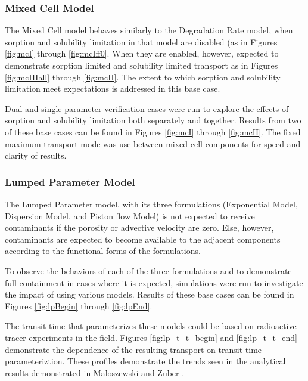\subsubsection{Mixed Cell Model}
The Mixed Cell model behaves similarly to the Degradation Rate model, when 
sorption and solubility limitation in that model are disabled (as in Figures 
\ref{fig:mcI} through \ref{fig:mcIff0}. When they are enabled, however, expected 
to demonstrate sorption limited and solubility limited transport as in Figures 
\ref{fig:mcIIIall} through \ref{fig:mcII}. The extent to which sorption and 
solubility limitation meet expectations is addressed in this base case.

Dual and single parameter verification cases were run to explore the effects of 
sorption and solubility limitation both separately and together.  Results from 
two of these base cases can be found in Figures \ref{fig:mcI} through 
\ref{fig:mcII}.
The fixed maximum transport mode was use between mixed cell components for speed 
and clarity of results.


\FloatBarrier

\subsubsection{Lumped Parameter Model}
The Lumped Parameter model, with its three formulations (Exponential Model, 
Dispersion Model, and Piston flow Model) is not expected to receive 
contaminants if the porosity or advective velocity are zero. Else, however, 
contaminants are expected to  become available to the adjacent components 
according to the functional forms of the formulations. 

To observe the behaviors of each of the three formulations and to demonstrate 
full containment in cases where it is expected, simulations were run to 
investigate the impact of using various models. Results of these base cases can be found in Figures 
\ref{fig:lpBegin} through \ref{fig:lpEnd}.



The transit time that parameterizes these models could be based on radioactive 
tracer experiments in the field. Figures \ref{fig:lp_t_t_begin} 
and \ref{fig:lp_t_t_end} demonstrate the dependence of the resulting transport on 
transit time parameteriztion. These profiles demonstrate the trends seen in the 
analytical results demonstrated in Maloszewski and Zuber 
\cite{maloszewski_lumped_1996}.

